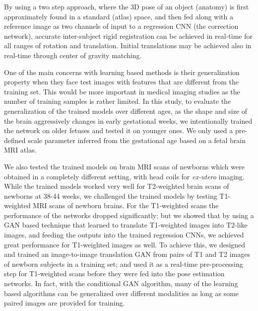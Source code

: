 \documentclass[journal,transmag]{IEEEtran}
\begin{document}
By using a two step approach, where the 3D pose of an object (anatomy) is first approximately found in a standard (atlas) space, and then fed along with a reference image as two channels of input to a regression CNN (the correction network), accurate inter-subject rigid registration can be achieved in real-time for all ranges of rotation and translation. Initial translations may be achieved also in real-time through center of gravity matching.

One of the main concerns with learning based methods is their generalization property when they face test images with features that are different from the training set. This would be more important in medical imaging studies as the number of training samples is rather limited. In this study, to evaluate the generalization of the trained models over different ages, as the shape and size of the brain aggressively changes in early gestational weeks, we intentionally trained the network on older fetuses and tested it on younger ones. We only used a pre-defined scale parameter inferred from the gestational age based on a fetal brain MRI atlas.

We also tested the trained models on brain MRI scans of newborns which were obtained in a completely different setting, with head coils for \textit{ex-utero} imaging. While the trained models worked very well for T2-weighted brain scans of newborns at 38-44 weeks, we challenged the trained models by testing T1-weighted MRI scans of newborn brains. For the T1-weighted scans the performance of the networks dropped significantly; but we showed that by using a GAN based technique that learned to translate T1-weighted images into T2-like images, and feeding the outputs into the trained regression CNNs, we achieved great performance for T1-weighted images as well. To achieve this, we designed and trained an image-to-image translation GAN from pairs of T1 and T2 images of newborn subjects in a training set; and used it as a real-time pre-processing step for T1-weighted scans before they were fed into the pose estimation networks. In fact, with the conditional GAN algorithm, many of the learning based algorithms can be generalized over different modalities as long as some paired images are provided for training.
\end{document}
